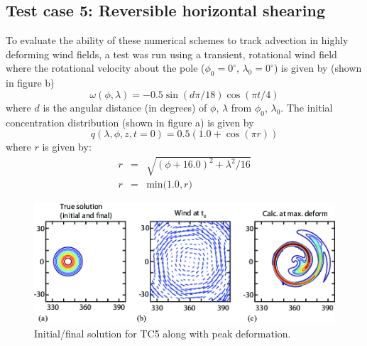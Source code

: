 \subsection{Test case 5: Reversible horizontal shearing}
To evaluate the ability of these numerical schemes to track advection in highly
deforming wind fields, a test was run using a transient, rotational wind field
where the rotational velocity about the pole
($\phi_0=0^{\circ}$, $\lambda_0=0^{\circ}$) is given by (shown in figure b)
\begin{equation}\label{EqTC5Wind}
\omega(\phi,\lambda) = -0.5\sin(d\pi/18) \cos(\pi t/4)
\end{equation}
where $d$ is the angular distance (in degrees) of $\phi$, $\lambda$ from $\phi_0$, $\lambda_0$.
The initial concentration distribution (shown in figure a) is given by
\begin{equation}\label{EqTC5Source1}
q(\lambda,\phi,z,t=0)=0.5 (1.0+\cos(\pi r))
\end{equation}
where $r$ is given by:
\begin{eqnarray}
r &=& \sqrt{(\phi+16.0)^2 + \lambda^2/16} \label{EqTC5Source2} \\
r &=& \mathrm{min(}1.0,r) \label{EqTC5Source3}
\end{eqnarray}
\begin{figure}[htbp]\vspace*{0cm}\hspace*{0cm}
\includegraphics[angle=0,scale=1.0]{Figures/Apx_Test/TC5_Def_Sol.png}
\parbox{15cm}{\caption{\label{FigTest_ConvTC5def}
Initial/final solution for TC5 along with peak deformation.
}}
\end{figure}

